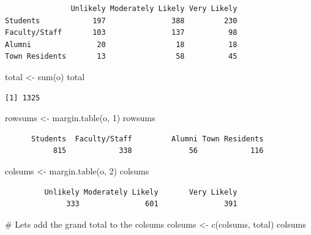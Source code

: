 \documentclass[
  letterpaper,
  DIV=11,
  numbers=noendperiod]{scrreprt}
\newenvironment{Shaded}{\begin{snugshade}}{\end{snugshade}}
\newcommand{\CommentTok}[1]{\textcolor[rgb]{0.37,0.37,0.37}{#1}}
\newcommand{\DecValTok}[1]{\textcolor[rgb]{0.68,0.00,0.00}{#1}}
\newcommand{\FunctionTok}[1]{\textcolor[rgb]{0.28,0.35,0.67}{#1}}
\newcommand{\NormalTok}[1]{\textcolor[rgb]{0.00,0.23,0.31}{#1}}
\newcommand{\OtherTok}[1]{\textcolor[rgb]{0.00,0.23,0.31}{#1}}
\begin{document}
\begin{verbatim}
               Unlikely Moderately Likely Very Likely
Students            197               388         230
Faculty/Staff       103               137          98
Alumni               20                18          18
Town Residents       13                58          45
\end{verbatim}

\begin{Shaded}
\begin{Highlighting}[]
\NormalTok{total }\OtherTok{\textless{}{-}} \FunctionTok{sum}\NormalTok{(o)}
\NormalTok{total}
\end{Highlighting}
\end{Shaded}

\begin{verbatim}
[1] 1325
\end{verbatim}

\begin{Shaded}
\begin{Highlighting}[]
\NormalTok{rowsums }\OtherTok{\textless{}{-}} \FunctionTok{margin.table}\NormalTok{(o, }\DecValTok{1}\NormalTok{)}
\NormalTok{rowsums}
\end{Highlighting}
\end{Shaded}

\begin{verbatim}
      Students  Faculty/Staff         Alumni Town Residents 
           815            338             56            116 
\end{verbatim}

\begin{Shaded}
\begin{Highlighting}[]
\NormalTok{colsums }\OtherTok{\textless{}{-}} \FunctionTok{margin.table}\NormalTok{(o, }\DecValTok{2}\NormalTok{)}
\NormalTok{colsums}
\end{Highlighting}
\end{Shaded}

\begin{verbatim}
         Unlikely Moderately Likely       Very Likely 
              333               601               391 
\end{verbatim}

\begin{Shaded}
\begin{Highlighting}[]
\CommentTok{\# Lets add the grand total to the colsums}
\NormalTok{colsums }\OtherTok{\textless{}{-}} \FunctionTok{c}\NormalTok{(colsums, total)}
\NormalTok{colsums}
\end{Highlighting}
\end{Shaded}
\end{document}
